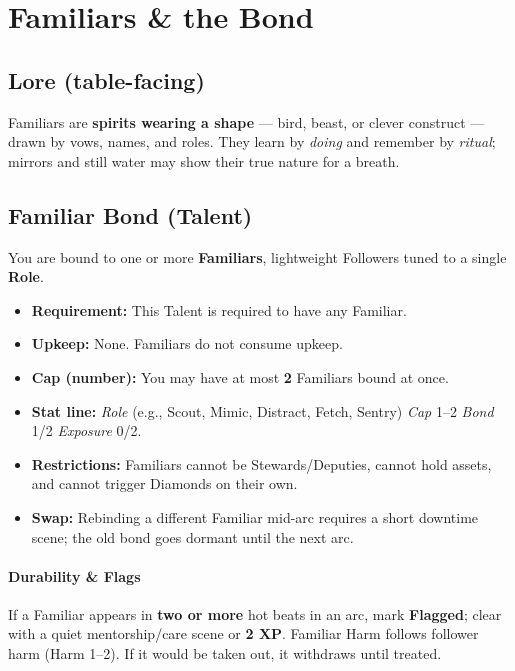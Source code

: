 \documentclass[12pt]{article}
\begin{document}
\section*{Familiars \& the Bond}

\subsection*{Lore (table-facing)}
Familiars are \textbf{spirits wearing a shape} — bird, beast, or clever construct — drawn by vows, names, and roles. They learn by \emph{doing} and remember by \emph{ritual}; mirrors and still water may show their true nature for a breath.

\subsection*{Familiar Bond (Talent)}
You are bound to one or more \textbf{Familiars}, lightweight Followers tuned to a single \textbf{Role}.

\begin{itemize}
  \item \textbf{Requirement:} This Talent is required to have any Familiar.
  \item \textbf{Upkeep:} None. Familiars do not consume upkeep.
  \item \textbf{Cap (number):} You may have at most \textbf{2} Familiars bound at once.
  \item \textbf{Stat line:} \emph{Role} (e.g., Scout, Mimic, Distract, Fetch, Sentry) \textbullet{} \emph{Cap} 1--2 \textbullet{} \emph{Bond} 1/2 \textbullet{} \emph{Exposure} 0/2.
  \item \textbf{Restrictions:} Familiars cannot be Stewards/Deputies, cannot hold assets, and cannot trigger Diamonds on their own.
  \item \textbf{Swap:} Rebinding a different Familiar mid-arc requires a short downtime scene; the old bond goes dormant until the next arc.
\end{itemize}

\paragraph{Durability \& Flags}
If a Familiar appears in \textbf{two or more} hot beats in an arc, mark \textbf{Flagged}; clear with a quiet mentorship/care scene or \textbf{2 XP}. Familiar Harm follows follower harm (Harm 1--2). If it would be taken out, it withdraws until treated.
\end{document}
